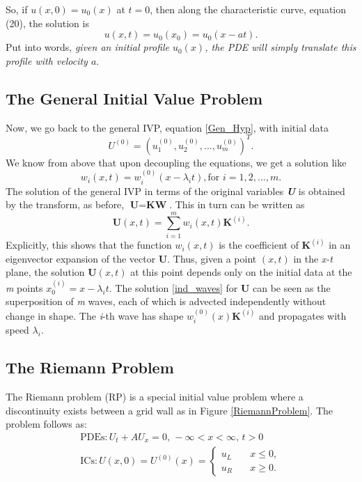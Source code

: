 \documentclass[]{article}
\begin{document}
		So, if $ u(x,0) = u_0(x) $ at $ t = 0 $, then along the characteristic curve, equation (20), the solution is
		\begin{equation}
			u(x,t) = u_0(x_0) = u_0(x-at).
			\label{general_sol}
		\end{equation}
		Put into words, \textit{given an initial profile $ u_0(x) $, the PDE will simply translate this profile with velocity $ a $}.
	
	\subsection{The General Initial Value Problem}
		Now, we go back to the general IVP, equation \ref{Gen_Hyp}, with initial data
		\begin{equation}
			U^{(0)} = (u_1^{(0)}, u_2^{(0)}, ..., u_m^{(0)})^T.
		\end{equation}
		We know from above that upon decoupling the equations, we get a solution like
		\begin{equation}
			w_i(x,t) = w_i^{(0)}(x - \lambda_i t), \mbox{for  } i = 1, 2, ..., m.
		\end{equation}
		The solution of the general IVP in terms of the original variables \textbf{\textit{U}} is obtained by the transform, as before, $ \textbf{U} = \textbf{KW} $. This in turn can be written as 
		\begin{equation}
			\textbf{U}(x,t) = \sum_{i = 1}^{m} w_i(x,t) \textbf{K}^{(i)}.
			\label{ind_waves}
		\end{equation}
		Explicitly, this shows that the function $ w_i(x,t) $ is the coefficient of $ \textbf{K}^{(i)} $ in an eigenvector expansion of the vector \textbf{U}. Thus, given a point $ (x,t) $ in the \textit{x-t} plane, the solution $ \textbf{U}(x,t) $ at this point depends only on the initial data at the \textit{m} points $ x_0^{(i)} = x - \lambda_i t $. The solution \ref{ind_waves} for \textbf{U} can be seen as the superposition of \textit{m} waves, each of which is advected independently without change in shape. The \textit{i}-th wave has shape $ w_i^{(0)}(x) \textbf{K}^{(i)} $ and propagates with speed $ \lambda_i $.
	
	\subsection{The Riemann Problem}
		The Riemann problem (RP) is a special initial value problem where a discontinuity exists between a grid wall as in Figure \ref{RiemannProblem}. The problem follows as:
		\begin{equation}
	    	\begin{aligned}
			\mbox{PDEs} : U_t + A U_x = 0\mbox{, } -\infty < x < \infty \mbox{, } t > 0 \\
			\mbox{ICs}: U(x,0) = U^{(0)}(x) = \left\{
			\begin{array}{ll}
			u_L & \quad x \leq 0, \\
			u_R & \quad x \geq 0.
			\end{array}
			\right.
		    \end{aligned}
		\end{equation}
	
\end{document}

